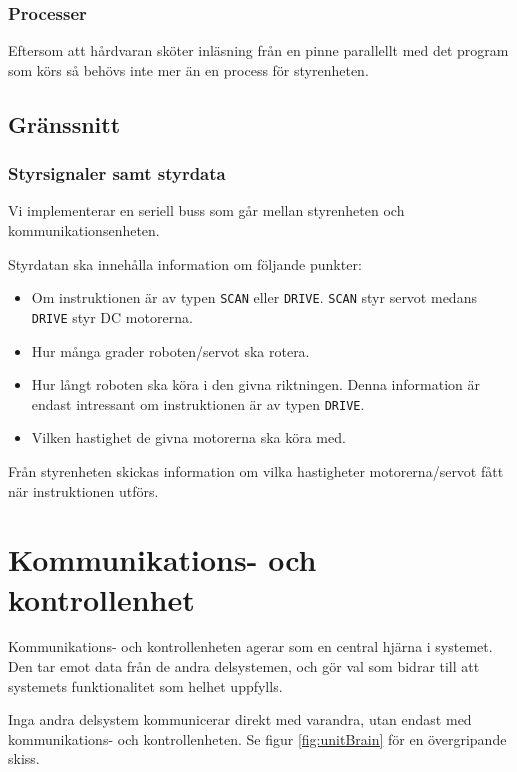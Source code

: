 \documentclass[a4paper,11pt]{article}
\begin{document}
\subsubsection{Processer}
Eftersom att hårdvaran sköter inläsning från en pinne parallellt med det program som körs så behövs inte mer än en process för styrenheten.

\clearpage

\subsection{Gränssnitt} \label{ssec:controlInterface}

\subsubsection{Styrsignaler samt styrdata}
Vi implementerar en seriell buss som går mellan styrenheten och kommunikationsenheten.

Styrdatan ska innehålla information om följande punkter:
\begin{itemize}
	\item Om instruktionen är av typen \texttt{SCAN} eller \texttt{DRIVE}. \texttt{SCAN} styr servot medans \texttt{DRIVE} styr DC motorerna.
	\item Hur många grader roboten/servot ska rotera.
	\item Hur långt roboten ska köra i den givna riktningen. Denna information är endast intressant om instruktionen är av typen \texttt{DRIVE}.
	\item Vilken hastighet de givna motorerna ska köra med.
\end{itemize}

Från styrenheten skickas information om vilka hastigheter motorerna/servot fått när instruktionen utförs.

\clearpage
\section{Kommunikations- och kontrollenhet} \label{sec:system3}
Kommunikations- och kontrollenheten agerar som en central hjärna i systemet. Den tar emot data från de andra delsystemen, och gör val som bidrar till att systemets funktionalitet som helhet uppfylls.

Inga andra delsystem kommunicerar direkt med varandra, utan endast med kommunikations- och kontrollenheten. Se figur \ref{fig:unitBrain} för en övergripande skiss.
\end{document}
